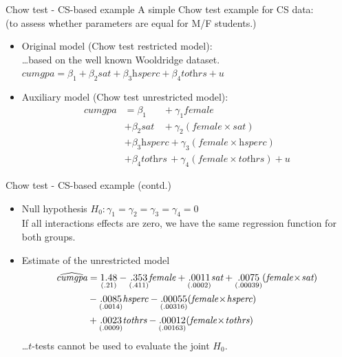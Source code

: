 \documentclass{beamer}
\begin{document}
\begin{frame}{Chow test - CS-based example}
A simple Chow test example for CS data: 
\\(to assess whether parameters are equal for M/F students.)
\vspace{0.3cm}
\begin{itemize}
\item Original model (Chow test restricted model):
\\ \dots based on the well known Wooldridge dataset.
\vspace{0.3cm}
\\ $ \textit{cumgpa} = \beta_1 + \beta_2 \textit{sat} 
     + \beta_3\textit{hsperc}+ \beta_4 \textit{tothrs} + u $
\vspace{0.3cm}
\item Auxiliary model (Chow test unrestricted model):
\begin{equation}
\begin{aligned} 
   \textit{cumgpa} &= \beta_1  ~~~~~~~\,+\gamma_1 \textit{female}  \\
   &+ \beta_2\textit{sat} ~~~~+ \gamma_2 (\textit{female} \! \times \! \textit{sat} ) \\
   &+ \beta_3\textit{hsperc} + \gamma_3 (\textit{female} \! \times \! \textit{hsperc} ) \\ 
   &+ \beta_4 \textit{tothrs} \,+ \gamma_4(\textit{female} \! \times \! \textit{tothrs} ) + u \nonumber
\end{aligned}
\end{equation}
\end{itemize}
\end{frame}
\begin{frame}{Chow test - CS-based example (contd.) }
\begin{itemize}
\item Null hypothesis
\vspace{0.3cm}
$H_0 : \gamma_1 = \gamma_2 = \gamma_3 = \gamma_4 = 0$ \\
If all interactions effects are zero, we have the same regression function for both groups.
\vspace{0.3cm}
\item Estimate of the unrestricted model
\begin{equation} \notag 
\begin{aligned}
\widehat{\textit{cumgpa}} &= \underset{(.21)}{1.48} - \underset{(.411)}{.353} \textit{female} + \underset{(.0002)}{.0011} \textit{sat} + \underset{(.00039)}{.0075}(\textit{female} \! \times \! \textit{sat} ) 
\\&- \underset{(.0014)}{.0085} \textit{hsperc} - \underset{(.00316)}{.00055} (\textit{female} \! \times \! \textit{hsperc} ) 
\\&+  \underset{(.0009)}{.0023} \textit{tothrs} - \underset{(.00163)}{.00012} (\textit{female} \! \times \! \textit{tothrs} )
\end{aligned}
\end{equation}
\dots $t$-tests cannot be used to evaluate the joint $H_0$. 
\end{itemize}
\end{frame}
\end{document}
